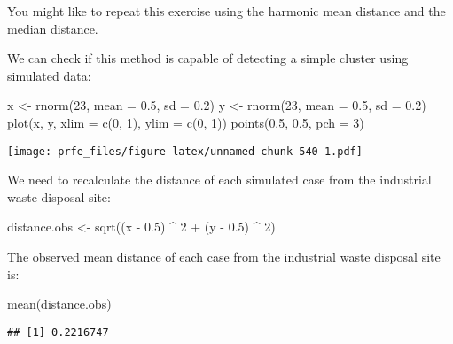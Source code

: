 \documentclass[
  12pt,
  a4paper]{book}
\newenvironment{Shaded}{\begin{snugshade}}{\end{snugshade}}
\newcommand{\AttributeTok}[1]{\textcolor[rgb]{0.77,0.63,0.00}{#1}}
\newcommand{\DecValTok}[1]{\textcolor[rgb]{0.00,0.00,0.81}{#1}}
\newcommand{\FloatTok}[1]{\textcolor[rgb]{0.00,0.00,0.81}{#1}}
\newcommand{\FunctionTok}[1]{\textcolor[rgb]{0.00,0.00,0.00}{#1}}
\newcommand{\NormalTok}[1]{#1}
\newcommand{\OtherTok}[1]{\textcolor[rgb]{0.56,0.35,0.01}{#1}}
\newcommand{\SpecialCharTok}[1]{\textcolor[rgb]{0.00,0.00,0.00}{#1}}
\begin{document}
You might like to repeat this exercise using the harmonic mean distance and the median distance.

We can check if this method is capable of detecting a simple cluster using simulated data:

\begin{Shaded}
\begin{Highlighting}[]
\NormalTok{x }\OtherTok{\textless{}{-}} \FunctionTok{rnorm}\NormalTok{(}\DecValTok{23}\NormalTok{, }\AttributeTok{mean =} \FloatTok{0.5}\NormalTok{, }\AttributeTok{sd =} \FloatTok{0.2}\NormalTok{)}
\NormalTok{y }\OtherTok{\textless{}{-}} \FunctionTok{rnorm}\NormalTok{(}\DecValTok{23}\NormalTok{, }\AttributeTok{mean =} \FloatTok{0.5}\NormalTok{, }\AttributeTok{sd =} \FloatTok{0.2}\NormalTok{)}
\FunctionTok{plot}\NormalTok{(x, y, }\AttributeTok{xlim =} \FunctionTok{c}\NormalTok{(}\DecValTok{0}\NormalTok{, }\DecValTok{1}\NormalTok{), }\AttributeTok{ylim =} \FunctionTok{c}\NormalTok{(}\DecValTok{0}\NormalTok{, }\DecValTok{1}\NormalTok{))}
\FunctionTok{points}\NormalTok{(}\FloatTok{0.5}\NormalTok{, }\FloatTok{0.5}\NormalTok{, }\AttributeTok{pch =} \DecValTok{3}\NormalTok{)}
\end{Highlighting}
\end{Shaded}

\texttt{[image: prfe\_files/figure-latex/unnamed-chunk-540-1.pdf]}

We need to recalculate the distance of each simulated case from the industrial waste disposal site:

\begin{Shaded}
\begin{Highlighting}[]
\NormalTok{distance.obs }\OtherTok{\textless{}{-}} \FunctionTok{sqrt}\NormalTok{((x }\SpecialCharTok{{-}} \FloatTok{0.5}\NormalTok{) }\SpecialCharTok{\^{}} \DecValTok{2} \SpecialCharTok{+}\NormalTok{ (y }\SpecialCharTok{{-}} \FloatTok{0.5}\NormalTok{) }\SpecialCharTok{\^{}} \DecValTok{2}\NormalTok{)}
\end{Highlighting}
\end{Shaded}

The observed mean distance of each case from the industrial waste disposal site is:

\begin{Shaded}
\begin{Highlighting}[]
\FunctionTok{mean}\NormalTok{(distance.obs)}
\end{Highlighting}
\end{Shaded}

\begin{verbatim}
## [1] 0.2216747
\end{verbatim}
\end{document}
